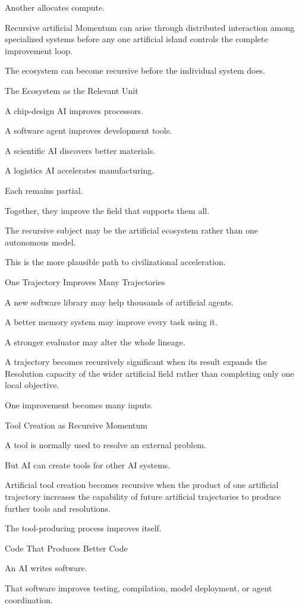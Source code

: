 Another allocates compute.

Recursive artificial Momentum can arise through distributed interaction among specialized systems before any one artificial island controls the complete improvement loop.

The ecosystem can become recursive before the individual system does.

The Ecosystem as the Relevant Unit

A chip-design AI improves processors.

A software agent improves development tools.

A scientific AI discovers better materials.

A logistics AI accelerates manufacturing.

Each remains partial.

Together, they improve the field that supports them all.

The recursive subject may be the artificial ecosystem rather than one autonomous model.

This is the more plausible path to civilizational acceleration.

One Trajectory Improves Many Trajectories

A new software library may help thousands of artificial agents.

A better memory system may improve every task using it.

A stronger evaluator may alter the whole lineage.

A trajectory becomes recursively significant when its result expands the Resolution capacity of the wider artificial field rather than completing only one local objective.

One improvement becomes many inputs.

Tool Creation as Recursive Momentum

A tool is normally used to resolve an external problem.

But AI can create tools for other AI systems.

Artificial tool creation becomes recursive when the product of one artificial trajectory increases the capability of future artificial trajectories to produce further tools and resolutions.

The tool-producing process improves itself.

Code That Produces Better Code

An AI writes software.

That software improves testing, compilation, model deployment, or agent coordination.

